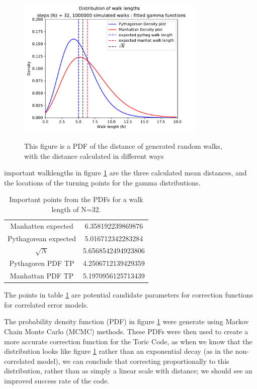 	\begin{figure}
		\centering
		\includegraphics[width = 0.8\textwidth]{figs/randomwalkdistribution_1000000_32}
		\label{fig:randomwalkdistributions}
		\caption{This figure is a PDF of the distance of generated random walks, with the distance calculated in different ways}
	\end{figure}
	important walklengths in figure \ref{fig:randomwalkdistributions} are the three calculated mean distances, and the locations of the turning points for the gamma distributions. 
	\begin{table}
	\centering
	\begin{tabular}{c c}
	Manhatten expected&  6.358192239869876\\ 
	Pythagorean expected&  5.016712342283284\\ 
	$\sqrt{N}$ &  5.6568542494923806\\ 
	Pythagoren PDF TP &  4.2506712139429359\\ 
	Manhattan PDF TP &  5.1970956125713439\\ 
	\end{tabular} 
	\caption{Important points from the PDFs for a walk length of N=32. }
	\label{tab:candidates}
	\end{table}
	The points in table \ref{tab:candidates} are potential candidate parameters for correction functions for correlated error models. 

 	The probability density function (PDF) in figure \ref{fig:randomwalkdistributions} were generate using Markov Chain Monte Carlo (MCMC) methods. These PDFs were then used to create a more accurate correction function for the Toric Code, as when we know that the distribution looks like figure \ref{fig:randomwalkdistributions} rather than an exponential decay (as in the non-correlated model), we can conclude that correcting proportionally to this distribution, rather than as simply a linear scale with distance; we should see an improved success rate of the code. 
 






